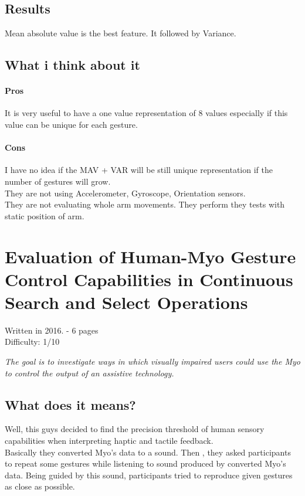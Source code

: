 \documentclass{article}
\begin{document}
\subsection{Results}
Mean absolute value is the best feature. It followed by Variance.
\subsection{What i think about it}
\paragraph{Pros}
It is very useful to have a one value representation of 8 values especially if this value can be unique for each gesture. 
\paragraph{Cons}
I have no idea if the MAV + VAR will be still unique representation if the number of gestures will grow. \\
They are not using Accelerometer, Gyroscope, Orientation sensors.\\
They are not evaluating whole arm movements.
They perform they tests with static position of arm.

\section{Evaluation of Human-Myo Gesture Control Capabilities in Continuous Search and Select Operations}
Written in 2016. - 6 pages\\
Difficulty: 1/10

\begin{center}
\textit{The goal is to investigate ways in which visually impaired users could use the Myo to control the output of an assistive technology.}
\end{center}
\subsection{What does it means?}
Well, this guys decided to find the precision threshold of human sensory capabilities when interpreting haptic and tactile feedback.\\ Basically they converted Myo's data to a sound. Then , they asked participants to repeat some gestures while listening to sound produced by converted Myo's data. Being guided by this sound, participants tried to reproduce given gestures as close as possible.
\end{document}
